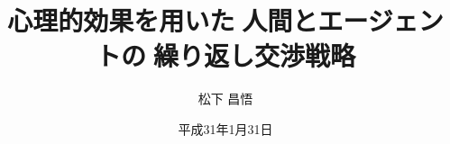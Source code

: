 \usepackage{gra_yasuda}
\usepackage{lscape}
\usepackage{graphicx}
\usepackage{here}
\usepackage{color}
\usepackage{amsmath}
\usepackage{subfig}
\usepackage{tascmac}
\usepackage{url}
\usepackage{ascmac}
\usepackage{booktabs}
\usepackage{otf}
\usepackage{comment}

\DeclareMathOperator*{\argmin}{arg\,min}
\DeclareMathOperator*{\argmax}{arg\,max}



\title{心理的効果を用いた人間とエージェントの繰り返し交渉戦略}

\author{松下 昌悟}



\date{平成31年1月31日}



\setlength{\baselineskip}{8truemm}
